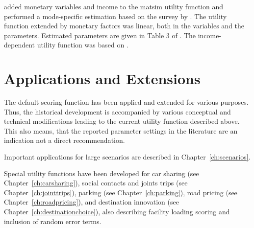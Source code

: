 \citet[][]{Kickhoefer_MastersThesis_2009} added monetary variables and income to the \gls{matsim} utility function and performed a mode-specific estimation based on the survey by \citet[][]{VrticEtAl_ResRep_SVI_2007}. The utility function extended by monetary factors was linear, both in the variables and the parameters. Estimated parameters are given in Table 3 of \citet[][]{Kickhoefer_MastersThesis_2009}. The income-dependent utility function was based on \citet[][]{Franklin_PhDThesis_2006}.

%

\section{Applications and Extensions}
\label{sec:appsExtensions}

The default scoring function has been applied and extended for various purposes. 
Thus, the historical development is accompanied by various conceptual and technical modifications leading to the current utility function described above. This also means, that the reported parameter settings in the literature are an indication not a direct recommendation.

Important applications for large scenarios are described in Chapter~\ref{ch:scenarios}.

Special utility functions have been developed for car sharing (see Chapter~\ref{ch:carsharing}), social contacts and joints trips (see Chapter~\ref{ch:jointtrips}), parking (see Chapter~\ref{ch:parking}), road pricing (see Chapter~\ref{ch:roadpricing}), and destination innovation (see Chapter~\ref{ch:destinationchoice}), also describing facility loading scoring and inclusion of random error terms. 
 
